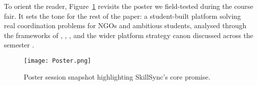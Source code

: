\documentclass[12pt,a4paper]{article}
\begin{document}
To orient the reader, Figure~\ref{fig:intro-showcase} revisits the poster we field-tested during the course fair. It sets the tone for the rest of the paper: a student-built platform solving real coordination problems for NGOs and ambitious students, analysed through the frameworks of \citet{Choudary2016}, \citet{Srnicek2017}, \citet{Reillier2017}, and the wider platform strategy canon discussed across the semester \citep{Lecture01,Lecture03,Lecture05}.

\begin{figure}[H]
  \centering
  \texttt{[image: Poster.png]}
  \caption{Poster session snapshot highlighting SkillSync's core promise.}
  \label{fig:intro-showcase}
\end{figure}












\newpage


\end{document}
